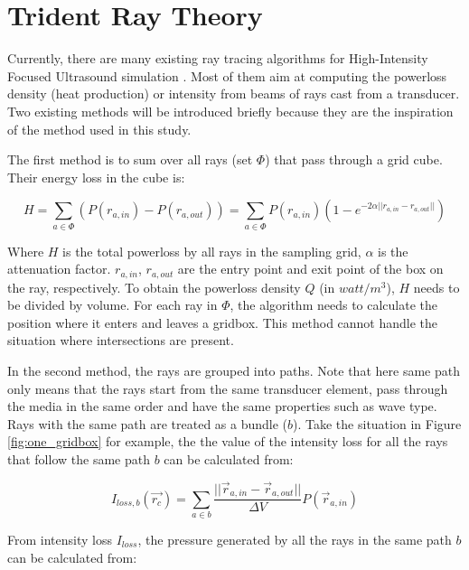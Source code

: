
\section{Trident Ray Theory} \label{sec:trident_theory}

Currently, there are many existing ray tracing algorithms for High-Intensity Focused Ultrasound simulation \cite{StochasticSim}. Most of them aim at computing the powerloss density (heat production) or intensity from beams of rays cast from a transducer. Two existing methods will be introduced briefly because they are the inspiration of the method used in this study.

The first method is to sum over all rays (set $\Phi$) that pass through a grid cube. Their energy loss in the cube is:

\begin{equation} \label{eq:first_rc}
    H = \sum_{a \in \Phi} (P(r_{a,in}) - P(r_{a,out})) = \sum_{a \in \Phi} P(r_{a,in})(1-e^{-2\alpha ||r_{a,in} - r_{a,out}||})
\end{equation}

Where $H$ is the total powerloss by all rays in the sampling grid, $\alpha$ is the attenuation factor. $r_{a,in}$, $r_{a, out}$ are the entry point  and exit point of the box on the ray, respectively. To obtain the powerloss density $Q$ (in $watt/m^3$), $H$ needs to be divided by volume. For each ray in $\Phi$, the algorithm needs to calculate the position where it enters and leaves a gridbox. This method cannot handle the situation where intersections are present.

In the second method, the rays are grouped into paths. Note that here same path only means that the rays start from the same transducer element, pass through the media in the same order and have the same properties such as wave type. Rays with the same path are treated as a bundle ($b$). Take the situation in Figure \ref{fig:one_gridbox} for example, the the value of the intensity loss for all the rays that follow the same path $b$ can be calculated from:

\begin{equation} \label{eq:calc_I_Loss}
    I_{loss,b}(\vec{r_c})=\sum_{a \in b} \frac{||\vec{r}_{a,in}-\vec{r}_{a,out}||}{\Delta V} P(\vec{r}_{a,in})
\end{equation}

From intensity loss $I_{loss}$, the pressure generated by all the rays in the same path $b$ can be calculated from:

